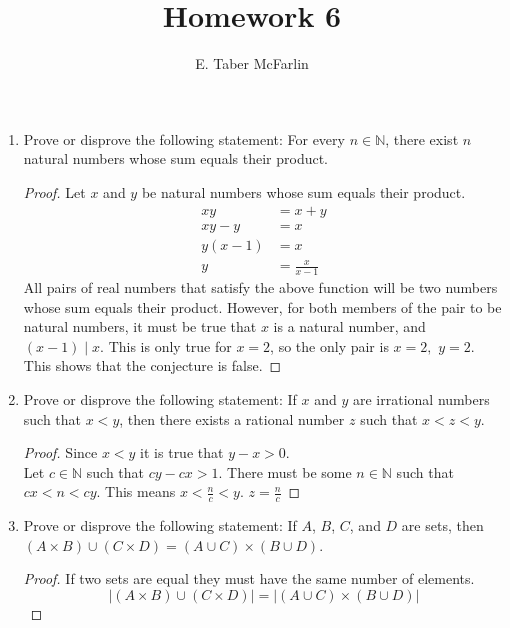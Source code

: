 \documentclass[12pt,a4paper,reqno,parskip=full]{amsart}
\numberwithin{equation}{section}
\theoremstyle{plain}
\theoremstyle{definition}
\begin{document}
\title{Homework 6}

\author{E. Taber McFarlin}

\maketitle

\begin{enumerate}
  \item Prove or disprove the following statement: For every $n\in\mathbb{N}$, there exist $n$
        natural numbers whose sum equals their product.
        \begin{proof}
          Let $x$ and $y$ be natural numbers whose sum equals their product.
          \begin{align*}
            xy       & = x + y           \\
            xy - y   & = x               \\
            y(x - 1) & = x               \\
            y        & = \frac{x}{x - 1}
          \end{align*}
          All pairs of real numbers that satisfy the above function will be two numbers whose sum
          equals their product. However, for both members of the pair to be natural numbers, it must
          be true that $x$ is a natural number, and $(x - 1 )\mid x$. This is only true for $x=2$,
          so the only pair is $x=2,$ $y = 2$. This shows that the conjecture is false.
        \end{proof}
  \item Prove or disprove the following statement: If $x$ and $y$ are irrational numbers such that
        $x < y$, then there exists a rational number $z$ such that $x<z<y$.
        \begin{proof} Since $x < y$ it is true that $y - x > 0$. \\
          Let $c\in\mathbb{N}$ such that $cy - cx > 1$. There must be some $n\in\mathbb{N}$ such
          that $cx<n<cy$. This means $\displaystyle x<\frac{n}{c}<y$. $\displaystyle z=\frac{n}{c}$
        \end{proof}
  \item Prove or disprove the following statement: If $A$, $B$, $C$, and $D$ are sets, then
        $(A\times B)\cup(C\times D)=(A\cup C)\times(B\cup D)$.
        \begin{proof}
          If two sets are equal they must have the same number of elements.
          \[|(A\times B)\cup(C\times D)| = |(A\cup C)\times(B\cup D)|\]


\end{proof}
\end{enumerate}
\end{document}
